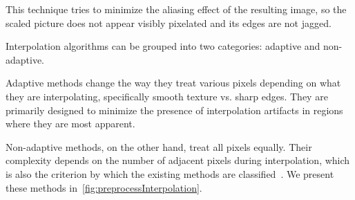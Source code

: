 This technique tries to minimize the aliasing effect of the resulting image, so the scaled picture does not appear visibly pixelated and its edges are not jagged.

Interpolation algorithms can be grouped into two categories: adaptive and non-adaptive.

Adaptive methods change the way they treat various pixels depending on what they are interpolating, specifically smooth texture vs. sharp edges. They are primarily designed to minimize the presence of interpolation artifacts in regions where they are most apparent.

Non-adaptive methods, on the other hand, treat all pixels equally. Their complexity depends on the number of adjacent pixels during interpolation, which is also the criterion by which the existing methods are classified~\cite{interpolation}. We present these methods in~\cref{fig:preprocessInterpolation}.

